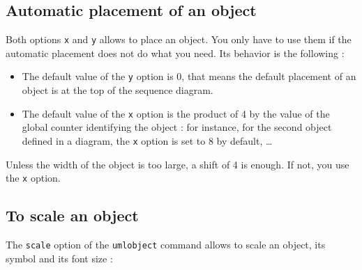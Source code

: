 \documentclass[a4paper,11pt]{report}
\newcommand{\inputTikZ}[1]{%
  }%
\newcommand{\inputTikZ}[1]{%
    \texttt{[image: fig/\#1.pdf]}%
  }%
\begin{document}
\medskip

\begin{minipage}{0.5\textwidth}

\end{minipage}
\begin{minipage}{0.5\textwidth}
\begin{center}
\inputTikZ{objectstereo}
\end{center}
\end{minipage}

\subsection{Automatic placement of an object}\label{ss.objpos}

Both options {\tt x} and {\tt y} allows to place an object. You only have to use them if the automatic placement does not do what you need. Its behavior is the following :

\begin{itemize}
\item The default value of the {\tt y} option is 0, that means the default placement of an object is at the top of the sequence diagram.
\item The default value of the {\tt x} option is the product of 4 by the value of the global counter identifying the object : for instance, for the second object defined in a diagram, the {\tt x} option is set to 8 by default, \ldots
\end{itemize}

Unless the width of the object is too large, a shift of 4 is enough. If not, you use the {\tt x} option.

\subsection{To scale an object}\label{ss.objdim}

The {\tt scale} option of the {\tt umlobject} command allows to scale an object, its symbol and its font size :

\medskip

\begin{minipage}{0.5\textwidth}

\end{minipage}
\begin{minipage}{0.5\textwidth}
\begin{center}
\inputTikZ{objectscale}
\end{center}
\end{minipage}
\end{document}
